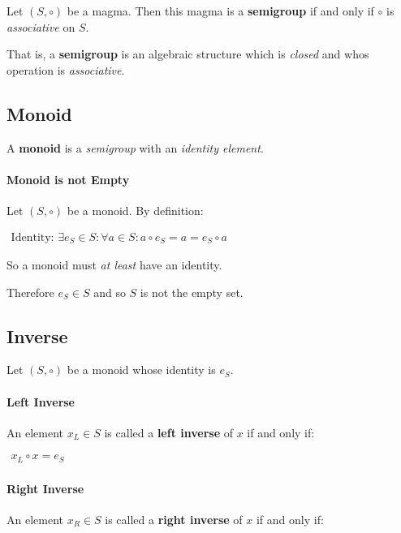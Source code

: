 Let $(S, \circ)$ be a magma. Then this magma is a \textbf{semigroup}
if and only if $\circ$ is \textit{associative} on $S$.


That is, a \textbf{semigroup} is an algebraic structure which is
\textit{closed} and whos operation is \textit{associative}.


\subsection{Monoid}
\label{sec:monoid}

A \textbf{monoid} is a \textit{semigroup} with an \textit{identity
  element}.

\paragraph{Monoid is not Empty}

Let $(S, \circ)$ be a monoid. By definition:

\begin{math}
  \begin{array}{c}
    \text{Identity: } \exists e_S \in S : \forall a \in S: a \circ e_S = a = e_S \circ a
  \end{array}
\end{math}

So a monoid must \textit{at least} have an identity.

Therefore $e_S \in S $ and so $S$ is not the empty set.


\subsection{Inverse}
\label{sec:inverse}

Let $(S, \circ)$ be a monoid whose identity is $e_S$.

\paragraph{Left Inverse}
An element $x_L \in S$ is called a \textbf{left inverse} of $x$ if and
only if:

\begin{math}
  \begin{array}{c}
    x_L \circ x = e_S
  \end{array}
\end{math}


\paragraph{Right Inverse}
An element $x_R \in S$ is called a \textbf{right inverse} of $x$ if and
only if:

